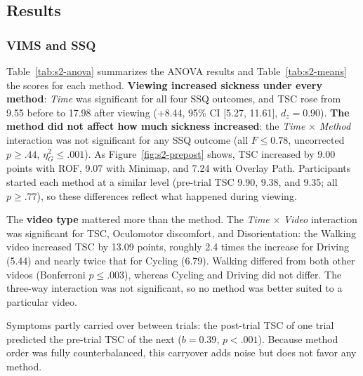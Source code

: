 \subsection{Results}

\subsubsection{VIMS and SSQ}

Table~\ref{tab:s2-anova} summarizes the ANOVA results and
Table~\ref{tab:s2-means} the scores for each method. \textbf{Viewing increased
sickness under every method}: \textit{Time} was significant for all four SSQ
outcomes, and TSC rose from 9.55 before to 17.98 after viewing (+8.44, 95\% CI
[5.27, 11.61], $d_z = 0.90$). \textbf{The method did not affect how much
sickness increased}: the \textit{Time} $\times$ \textit{Method} interaction was
not significant for any SSQ outcome (all $F \le 0.78$, uncorrected
$p \ge .44$, $\eta^2_G \le .001$). As Figure~\ref{fig:s2-prepost} shows, TSC
increased by 9.00 points with ROF, 9.07 with Minimap, and 7.24 with Overlay
Path. Participants started each method at a similar level (pre-trial TSC 9.90,
9.38, and 9.35; all $p \ge .77$), so these differences reflect what happened
during viewing.

The \textbf{video type} mattered more than the method. The \textit{Time}
$\times$ \textit{Video} interaction was significant for TSC, Oculomotor
discomfort, and Disorientation: the Walking video increased TSC by 13.09
points, roughly 2.4 times the increase for Driving (5.44) and nearly twice that
for Cycling (6.79). Walking differed from both other videos (Bonferroni
$p \le .003$), whereas Cycling and Driving did not differ. The three-way
interaction was not significant, so no method was better suited to a
particular video.

Symptoms partly carried over between trials: the post-trial TSC of one trial
predicted the pre-trial TSC of the next ($b = 0.39$, $p < .001$). Because
method order was fully counterbalanced, this carryover adds noise but does not
favor any method.

